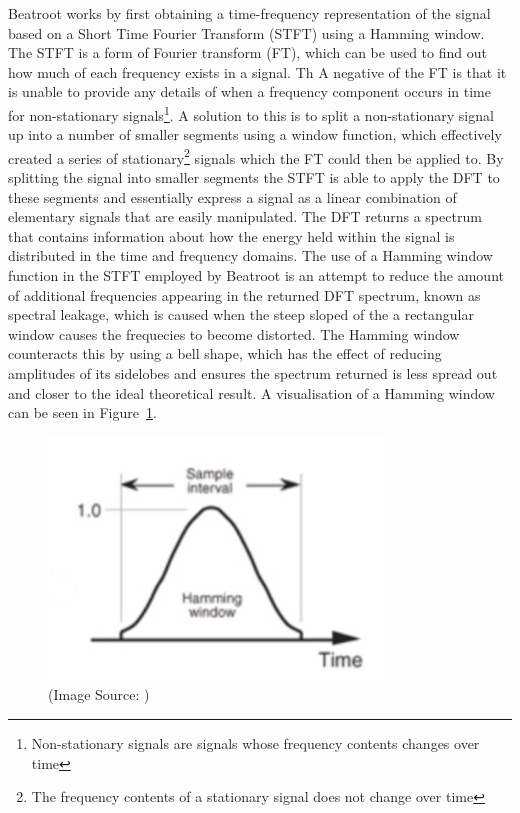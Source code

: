 \documentclass[a4paper, 11pt]{article}
\begin{document}
Beatroot works by first obtaining a time-frequency representation of the signal based on a Short Time Fourier Transform (STFT) using a Hamming window\cite{dixon2}. The STFT is a form of Fourier transform (FT), which can be used to find out how much of each frequency exists in a signal. Th A negative of the FT is that it is unable to provide any details of when a frequency component occurs in time for non-stationary signals\footnote{Non-stationary signals are signals whose frequency contents changes over time\cite{polikapt2}}. A solution to this is to split a non-stationary signal up into a number of smaller segments using a window function, which effectively created a series of stationary\footnote{The frequency contents of a stationary signal does not change over time} signals which the FT could then be applied to. By splitting the signal into smaller segments the STFT is able to apply the DFT to these segments and essentially express a signal as a linear combination of elementary signals that are easily manipulated. The DFT returns a spectrum that contains information about how the energy held within the signal is distributed in the time and frequency domains\cite{tzane2}. The use of a Hamming window function in the STFT employed by Beatroot is an attempt to reduce the amount of additional frequencies appearing in the returned DFT spectrum, known as spectral leakage, which is caused when the steep sloped of the a rectangular window causes the frequecies to become distorted. The Hamming window counteracts this by using a bell shape, which has the effect of reducing amplitudes of its sidelobes\cite{lyons} and ensures the spectrum returned is less spread out and closer to the ideal theoretical result\cite{tzane2}. A visualisation of a Hamming window can be seen in Figure~\ref{fig: hamWin}. 

\begin{figure}[ht]
	\centering
	\includegraphics[scale=0.36]{hamWin}
	\caption{(Image Source: \cite{lyons})}
	\label{fig: hamWin}
\end{figure}
\end{document}
